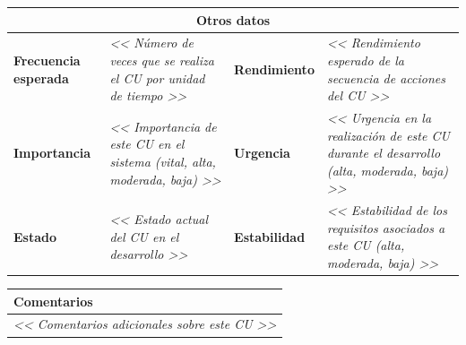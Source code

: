 \begin{table}[h!]
\centering
\renewcommand{\arraystretch}{1.5}
\begin{tabular}{|p{3cm}|p{4.5cm}|p{3cm}|p{4.5cm}|}
\hline
\multicolumn{4}{|c|}{\cellcolor[HTML]{F2F2F2}\textbf{Otros datos}} \\ 
\hline
\textbf{Frecuencia esperada} & \textit{<< Número de veces que se realiza el CU por unidad de tiempo >>} & \textbf{Rendimiento} & \textit{<< Rendimiento esperado de la secuencia de acciones del CU >>} \\ 
\hline
\textbf{Importancia} & \textit{<< Importancia de este CU en el sistema (vital, alta, moderada, baja) >>} & \textbf{Urgencia} & \textit{<< Urgencia en la realización de este CU durante el desarrollo (alta, moderada, baja) >>} \\ 
\hline
\textbf{Estado} & \textit{<< Estado actual del CU en el desarrollo >>} & \textbf{Estabilidad} & \textit{<< Estabilidad de los requisitos asociados a este CU (alta, moderada, baja) >>} \\ 
\hline
\end{tabular}
\end{table}

\vspace{0.5cm}

\begin{table}[h!]
\centering
\renewcommand{\arraystretch}{1.5}
\begin{tabular}{|p{15cm}|}
\hline
\cellcolor[HTML]{F2F2F2}\textbf{Comentarios} \\ 
\hline
\textit{<< Comentarios adicionales sobre este CU >>} \\ 
\hline
\end{tabular}
\end{table}
